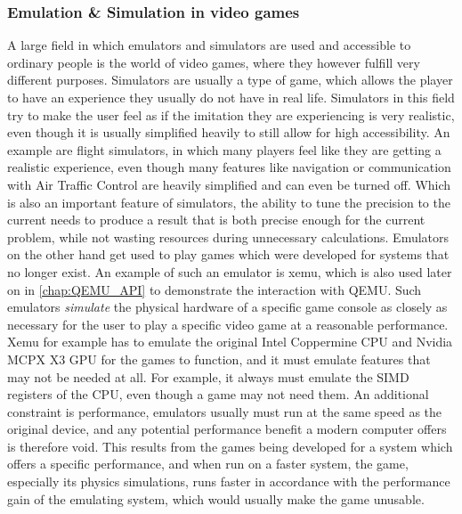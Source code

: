 \subsubsection{Emulation \& Simulation in video games}
A large field in which emulators and simulators are used and accessible to ordinary people
is the world of video games,
where they however fulfill very different purposes.
Simulators are usually a type of game,
which allows the player to have an experience they usually do not have in real life.
Simulators in this field try to make the user feel as if the imitation they are experiencing is very realistic,
even though it is usually simplified heavily to still allow for high accessibility.
An example are flight simulators, in which many players feel like they are getting a realistic experience,
even though many features like navigation or communication with Air Traffic Control are heavily simplified
and can even be turned off.
Which is also an important feature of simulators, the ability to tune the precision
to the current needs to produce a result that is both precise enough for the current problem,
while not wasting resources during unnecessary calculations.\linebreak
Emulators on the other hand get used to play games which were developed for systems that no longer exist.
An example of such an emulator is xemu\cite{xemu},
which is also used later on in \autoref{chap:QEMU_API} to demonstrate the interaction with QEMU.
Such emulators \emph{simulate} the physical hardware of a specific game console
as closely as necessary for the user to play a specific video game at a reasonable performance.
Xemu for example has to emulate the original Intel Coppermine CPU and Nvidia MCPX X3 GPU
for the games to function, and it must emulate features that may not be needed at all.
For example, it always must emulate the SIMD registers of the CPU, even though a game may not need them.
An additional constraint is performance, emulators usually must run at the same speed as the original device,
and any potential performance benefit a modern computer offers is therefore void.
This results from the games being developed for a system which offers a specific performance,
and when run on a faster system, the game, especially its physics simulations,
runs faster in accordance with the performance gain of the emulating system,
which would usually make the game unusable.

